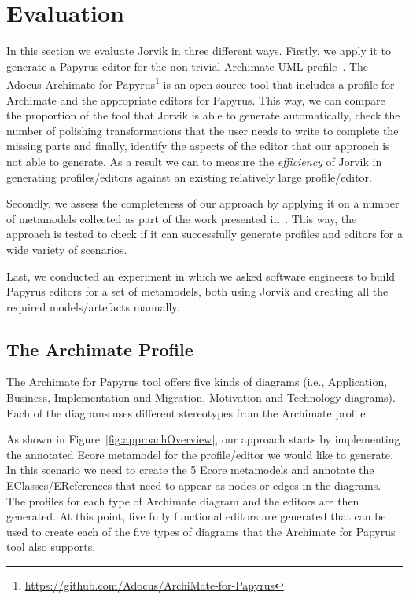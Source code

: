 \section{Evaluation}
\label{sec:evaluation}

In this section we evaluate Jorvik in three different ways. 
Firstly, we apply it to generate a Papyrus editor for the non-trivial Archimate UML profile~\cite{iacob2009archimate,haren2012archimate}. 
The Adocus Archimate for Papyrus\footnote{\url{https://github.com/Adocus/ArchiMate-for-Papyrus}} is an open-source tool that includes a profile for Archimate and the appropriate editors for Papyrus. 
This way, we can compare the proportion of the tool that Jorvik is able to generate automatically, check the number of polishing transformations that the user needs to write to complete the missing parts and finally, identify the aspects of the editor that our approach is not able to generate.
As a result we can to measure the \textit{efficiency} of Jorvik in generating profiles/editors against an existing relatively large profile/editor. 

Secondly, we assess the completeness of our approach by applying it on a number of metamodels collected as part of the work presented in~\cite{williams2013metamodels}. 
This way, the approach is tested to check if it can successfully generate profiles and editors for a wide variety of scenarios.

Last, we conducted an experiment in which we asked software engineers to build Papyrus editors for a set of metamodels, both using Jorvik and creating all the required models/artefacts manually.

\subsection{The Archimate Profile}
\label{sec:efficiencyEvaluation}
The Archimate for Papyrus tool offers five kinds of diagrams (i.e., Application, Business, Implementation and Migration, Motivation and Technology diagrams). 
Each of the diagrams uses different stereotypes from the Archimate profile. 

As shown in Figure~\ref{fig:approachOverview}, our approach starts by implementing the annotated Ecore metamodel for the profile/editor we would like to generate. 
In this scenario we need to create the 5 Ecore metamodels and annotate the EClasses/EReferences that need to appear as nodes or edges in the diagrams. 
The profiles for each type of Archimate diagram and the editors are then generated. 
At this point, five fully functional editors are generated that can be used to create each of the five types of diagrams that the Archimate for Papyrus tool also supports. 

